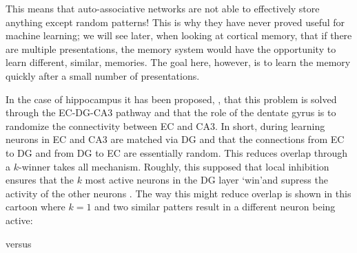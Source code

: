 \documentclass[11pt,a4paper]{scrartcl}
\begin{document}
This means that auto-associative networks are not able to effectively
store anything except random patterns! This is why they have never
proved useful for machine learning; we will see later, when looking at cortical memory, that if there are multiple presentations, the memory system would have the opportunity to learn different, similar, memories. The goal here, however, is to learn the memory quickly after a small number of presentations.

In the case of hippocampus it has been proposed,
\cite{OReillyMcClelland1994a}, that this problem is solved through the
EC-DG-CA3 pathway and that the role of the dentate gyrus is to
randomize the connectivity between EC and CA3. In short, during
learning neurons in EC and CA3 are matched via DG and that the
connections from EC to DG and from DG to EC are essentially
random. This reduces overlap through a $k$-winner takes all
mechanism. Roughly, this supposed that local inhibition ensures that
the $k$ most active neurons in the DG layer \lq{}win\rq and supress
the activity of the other neurons \cite{OReillyMcClelland1994a}. The
way this might reduce overlap is shown in this cartoon where $k=1$ and
two similar patters result in a different neuron being active:
\begin{center}
\end{center}
versus
\begin{center}
\end{center}
\end{document}

